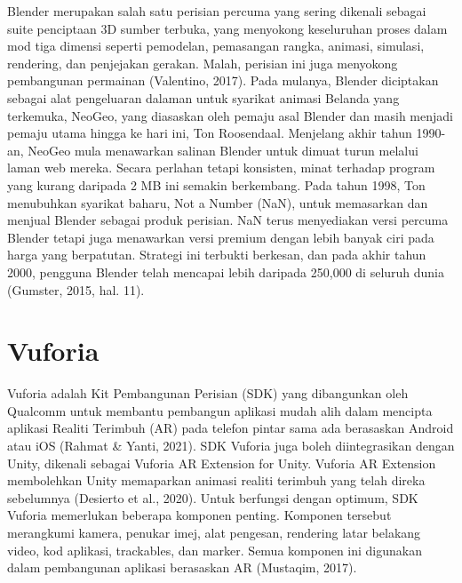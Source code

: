 	\hspace{1cm}Blender merupakan salah satu perisian percuma yang sering dikenali sebagai suite penciptaan 3D sumber terbuka, yang menyokong keseluruhan proses dalam mod tiga dimensi seperti pemodelan, pemasangan rangka, animasi, simulasi, rendering, dan penjejakan gerakan. Malah, perisian ini juga menyokong pembangunan permainan (Valentino, 2017). Pada mulanya, Blender diciptakan sebagai alat pengeluaran dalaman untuk syarikat animasi Belanda yang terkemuka, NeoGeo, yang diasaskan oleh pemaju asal Blender dan masih menjadi pemaju utama hingga ke hari ini, Ton Roosendaal. Menjelang akhir tahun 1990-an, NeoGeo mula menawarkan salinan Blender untuk dimuat turun melalui laman web mereka. Secara perlahan tetapi konsisten, minat terhadap program yang kurang daripada 2 MB ini semakin berkembang. Pada tahun 1998, Ton menubuhkan syarikat baharu, Not a Number (NaN), untuk memasarkan dan menjual Blender sebagai produk perisian. NaN terus menyediakan versi percuma Blender tetapi juga menawarkan versi premium dengan lebih banyak ciri pada harga yang berpatutan. Strategi ini terbukti berkesan, dan pada akhir tahun 2000, pengguna Blender telah mencapai lebih daripada 250,000 di seluruh dunia (Gumster, 2015, hal. 11).
\section{Vuforia}
	Vuforia adalah Kit Pembangunan Perisian (SDK) yang dibangunkan oleh Qualcomm untuk membantu pembangun aplikasi mudah alih dalam mencipta aplikasi Realiti Terimbuh (AR) pada telefon pintar sama ada berasaskan Android atau iOS (Rahmat & Yanti, 2021). SDK Vuforia juga boleh diintegrasikan dengan Unity, dikenali sebagai Vuforia AR Extension for Unity. Vuforia AR Extension membolehkan Unity memaparkan animasi realiti terimbuh yang telah direka sebelumnya (Desierto et al., 2020). Untuk berfungsi dengan optimum, SDK Vuforia memerlukan beberapa komponen penting. Komponen tersebut merangkumi kamera, penukar imej, alat pengesan, rendering latar belakang video, kod aplikasi, trackables, dan marker. Semua komponen ini digunakan dalam pembangunan aplikasi berasaskan AR (Mustaqim, 2017).
